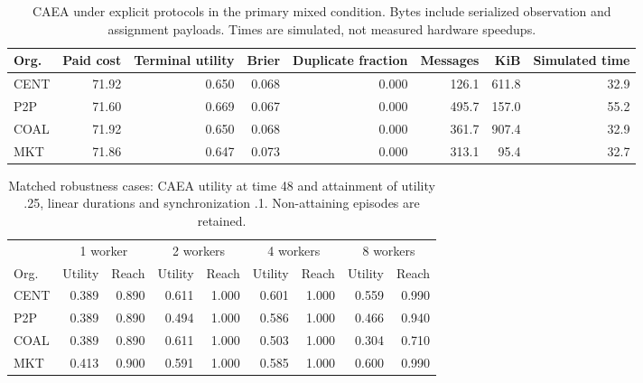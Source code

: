 \begin{table}[t]\centering\small

\caption{CAEA under explicit protocols in the primary mixed condition. Bytes include serialized observation and assignment payloads. Times are simulated, not measured hardware speedups.}

\begin{tabular}{lrrrrrrr}\toprule Org. & Paid cost & Terminal utility & Brier & Duplicate fraction & Messages & KiB & Simulated time\\\midrule

CENT & 71.92 & 0.650 & 0.068 & 0.000 & 126.1 & 611.8 & 32.9\\

P2P & 71.60 & 0.669 & 0.067 & 0.000 & 495.7 & 157.0 & 55.2\\

COAL & 71.92 & 0.650 & 0.068 & 0.000 & 361.7 & 907.4 & 32.9\\

MKT & 71.86 & 0.647 & 0.073 & 0.000 & 313.1 & 95.4 & 32.7\\

\bottomrule\end{tabular}\end{table}

\begin{table}[t]\centering\small

\caption{Matched robustness cases: CAEA utility at time 48 and attainment of utility .25, linear durations and synchronization .1. Non-attaining episodes are retained.}

\begin{tabular}{lrrrrrrrr}\toprule & \multicolumn{2}{c}{1 worker} & \multicolumn{2}{c}{2 workers} & \multicolumn{2}{c}{4 workers} & \multicolumn{2}{c}{8 workers}\\ Org. & Utility & Reach & Utility & Reach & Utility & Reach & Utility & Reach\\\midrule

CENT & 0.389 & 0.890 & 0.611 & 1.000 & 0.601 & 1.000 & 0.559 & 0.990\\

P2P & 0.389 & 0.890 & 0.494 & 1.000 & 0.586 & 1.000 & 0.466 & 0.940\\

COAL & 0.389 & 0.890 & 0.611 & 1.000 & 0.503 & 1.000 & 0.304 & 0.710\\

MKT & 0.413 & 0.900 & 0.591 & 1.000 & 0.585 & 1.000 & 0.600 & 0.990\\

\bottomrule\end{tabular}\end{table}

